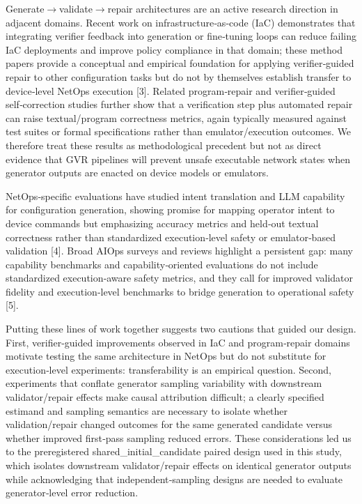 \documentclass[conference]{IEEEtran}
\begin{document}
Generate\ensuremath{\rightarrow}validate\ensuremath{\rightarrow}repair architectures are an active research direction in adjacent domains. Recent work on infrastructure‑as‑code (IaC) demonstrates that integrating verifier feedback into generation or fine‑tuning loops can reduce failing IaC deployments and improve policy compliance in that domain; these method papers provide a conceptual and empirical foundation for applying verifier‑guided repair to other configuration tasks but do not by themselves establish transfer to device‑level NetOps execution [3]. Related program‑repair and verifier‑guided self‑correction studies further show that a verification step plus automated repair can raise textual/program correctness metrics, again typically measured against test suites or formal specifications rather than emulator/execution outcomes. We therefore treat these results as methodological precedent but not as direct evidence that GVR pipelines will prevent unsafe executable network states when generator outputs are enacted on device models or emulators.

NetOps‑specific evaluations have studied intent translation and LLM capability for configuration generation, showing promise for mapping operator intent to device commands but emphasizing accuracy metrics and held‑out textual correctness rather than standardized execution‑level safety or emulator‑based validation [4]. Broad AIOps surveys and reviews highlight a persistent gap: many capability benchmarks and capability‑oriented evaluations do not include standardized execution‑aware safety metrics, and they call for improved validator fidelity and execution‑level benchmarks to bridge generation to operational safety [5].

Putting these lines of work together suggests two cautions that guided our design. First, verifier‑guided improvements observed in IaC and program‑repair domains motivate testing the same architecture in NetOps but do not substitute for execution‑level experiments: transferability is an empirical question. Second, experiments that conflate generator sampling variability with downstream validator/repair effects make causal attribution difficult; a clearly specified estimand and sampling semantics are necessary to isolate whether validation/repair changed outcomes for the same generated candidate versus whether improved first‑pass sampling reduced errors. These considerations led us to the preregistered shared\_initial\_candidate paired design used in this study, which isolates downstream validator/repair effects on identical generator outputs while acknowledging that independent‑sampling designs are needed to evaluate generator‑level error reduction.
\end{document}
